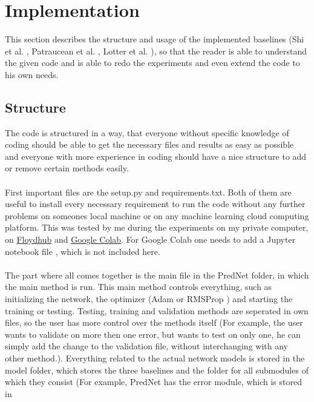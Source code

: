 \section{Implementation} \label{section::implementation}
 This section describes the structure and usage of the implemented baselines (Shi et al. \cite{Shi2015}, Patraucean et al. \cite{Patraucean2015},
 Lotter et al. \cite{Lotter2016}), so that the reader is able to understand the given code and is able to redo the experiments and even extend the code to
 his own needs.
  
 \subsection{Structure} \label{subsection::structure}
  The code is structured in a way, that everyone without specific knowledge of coding should be able to get the necessary files and results as easy as possible and
  everyone with more experience in coding should have a nice structure to add or remove certain methods easily.\\\\
  First important files are the setup.py and requirements.txt. Both of them are useful to install every necessary requirement to run the code without any further
  problems on someones local machine or on any machine learning cloud computing platform. This was tested by me during the experiments on my private computer, on 
  \href{www.floydhub.com} {Floydhub} and \href{colab.research.google.com}{Google Colab}.
  For Google Colab one needs to add a Jupyter notebook file \cite{Kluyver2016}, which is not included here.\\\\
  The part where all comes together is the main file in the PredNet folder, in which the main method is run. This main method controls everything, such as 
  initializing the network,
  the optimizer (Adam \cite{Kingma2015} or RMSProp \cite{Ruder2016}) and starting the training or testing. Testing, training and validation methods are seperated 
  in own files, so the user has more 
  control over the methods itself (For example, the user wants to validate on more then one error, but wants to test on only one, he can simply
  add the change to the validation file, without interchanging with any other method.). Everything related to the actual network models is stored in the model 
  folder, which stores the three baselines and the folder for all submodules of which they consist (For example, PredNet has the error module, which is stored in 
